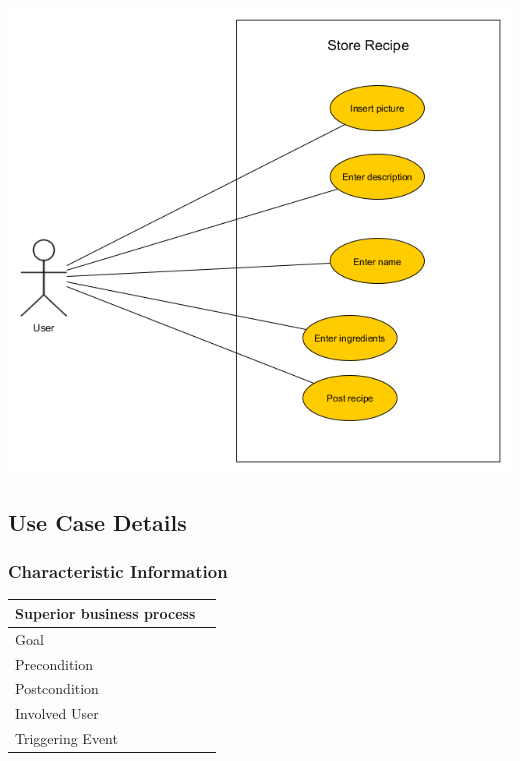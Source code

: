 \documentclass[12pt]{article}
\theoremstyle{definition}
\begin{document}
\includegraphics[scale=.5]{UseCaseStoreRecipe.png}\\



\subsection{Use Case Details}

\subsubsection{Characteristic Information}

\begin{tabular}{|l|l|}
\hline
Superior business process &  \\ \hline
Goal &  \\ \hline
Precondition &  \\ \hline
Postcondition &  \\ \hline
Involved User &  \\ \hline
Triggering Event &  \\ \hline
\end{tabular}
\end{document}
